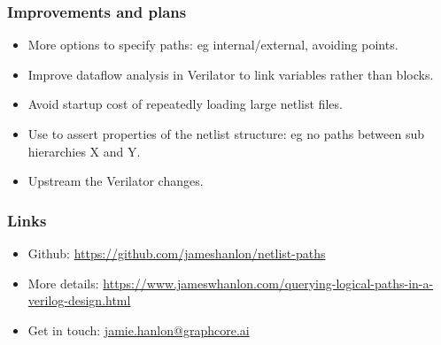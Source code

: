 \documentclass[professionalfonts]{beamer}
\begin{document}
\begin{frame}
\frametitle{Improvements and plans}
  \begin{itemize}
  \item More options to specify paths: eg internal/external, avoiding points.
  \item Improve dataflow analysis in Verilator to link variables rather than
    blocks.
  \item Avoid startup cost of repeatedly loading large netlist files.
  \item Use to assert properties of the netlist structure: eg no paths between
    sub hierarchies X and Y.
  \item Upstream the Verilator changes.
  \end{itemize}
\end{frame}

\begin{frame}
\frametitle{Links}
  \begin{itemize}
  \item Github:
    \url{https://github.com/jameshanlon/netlist-paths}
  \item More details:
    \url{https://www.jameswhanlon.com/querying-logical-paths-in-a-verilog-design.html}
  \item Get in touch:
    \url{jamie.hanlon@graphcore.ai}
  \end{itemize}
\end{frame}
\end{document}
